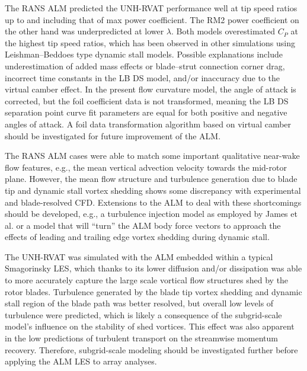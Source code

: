 The RANS ALM predicted the UNH-RVAT performance well at tip speed ratios up to
and including that of max power coefficient. The RM2 power coefficient on the
other hand was underpredicted at lower $\lambda$. Both models overestimated
$C_P$ at the highest tip speed ratios, which has been observed in other
simulations using Leishman--Beddoes type dynamic stall models. Possible
explanations include underestimation of added mass effects or blade--strut
connection corner drag, incorrect time constants in the LB DS model, and/or
inaccuracy due to the virtual camber effect. In the present flow curvature
model, the angle of attack is corrected, but the foil coefficient data is not
transformed, meaning the LB DS separation point curve fit parameters are equal
for both positive and negative angles of attack. A foil data transformation
algorithm based on virtual camber should be investigated for future improvement
of the ALM.

The RANS ALM cases were able to match some important qualitative near-wake flow
features, e.g., the mean vertical advection velocity towards the mid-rotor
plane. However, the mean flow structure and turbulence generation due to blade
tip and dynamic stall vortex shedding shows some discrepancy with experimental
and blade-resolved CFD. Extensions to the ALM to deal with these shortcomings
should be developed, e.g., a turbulence injection model as employed by James et
al. \cite{James2010} or a model that will ``turn'' the ALM body force vectors to
approach the effects of leading and trailing edge vortex shedding during dynamic
stall.

The UNH-RVAT was simulated with the ALM embedded within a typical Smagorinsky
LES, which thanks to its lower diffusion and/or dissipation was able to more
accurately capture the large scale vortical flow structures shed by the rotor
blades. Turbulence generated by the blade tip vortex shedding and dynamic stall
region of the blade path was better resolved, but overall low levels of
turbulence were predicted, which is likely a consequence of the subgrid-scale
model's influence on the stability of shed vortices. This effect was also
apparent in the low predictions of turbulent transport on the streamwise
momentum recovery. Therefore, subgrid-scale modeling should be investigated
further before applying the ALM LES to array analyses.

